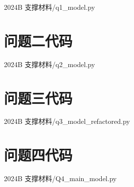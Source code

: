 \documentclass[withoutpreface,bwprint]{cumcmthesis}
\numberwithin{equation}{section}
\begin{document}
\begin{appendices}

    {2024B 支撑材料/q1_model.py}
\newpage
\section{问题二代码}


    {2024B 支撑材料/q2_model.py}
\newpage
\section{问题三代码}


    {2024B 支撑材料/q3_model_refactored.py}
\newpage
\section{问题四代码}


    {2024B 支撑材料/Q4_main_model.py}






\end{appendices}
\end{document}
